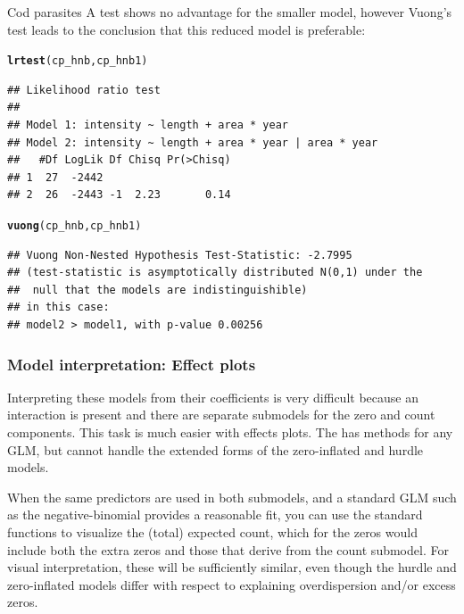 \documentclass[11pt]{book}\usepackage[]{graphicx}\usepackage[]{color}
\makeatletter
\newcommand{\hlstd}[1]{\textcolor[rgb]{0.345,0.345,0.345}{#1}}%
\newcommand{\hlkwd}[1]{\textcolor[rgb]{0.737,0.353,0.396}{\textbf{#1}}}%
\newenvironment{kframe}{%
 \def\at@end@of@kframe{}%
 \ifinner\ifhmode%
  \def\at@end@of@kframe{\end{minipage}}%
  \begin{minipage}{\columnwidth}%
 \fi\fi%
 \def\FrameCommand##1{\hskip\@totalleftmargin \hskip-\fboxsep
 \colorbox{shadecolor}{##1}\hskip-\fboxsep
     \hskip-\linewidth \hskip-\@totalleftmargin \hskip\columnwidth}%
 \MakeFramed {\advance\hsize-\width
   \@totalleftmargin\z@ \linewidth\hsize
   \@setminipage}}%
 {\par\unskip\endMakeFramed%
 \at@end@of@kframe}
\newenvironment{knitrout}{}{} %
\renewenvironment{knitrout}{\small\renewcommand{\baselinestretch}{.85}}{} %
\makeatother
\begin{document}
\begin{Example}[cod2]{Cod parasites}
A \LR test shows no advantage for the smaller model, however
Vuong's test leads to the conclusion that this reduced model is preferable:
\begin{knitrout}
\color{fgcolor}\begin{kframe}
\begin{alltt}
\hlkwd{lrtest}\hlstd{(cp_hnb, cp_hnb1)}
\end{alltt}
\begin{verbatim}
## Likelihood ratio test
## 
## Model 1: intensity ~ length + area * year
## Model 2: intensity ~ length + area * year | area * year
##   #Df LogLik Df Chisq Pr(>Chisq)
## 1  27  -2442                    
## 2  26  -2443 -1  2.23       0.14
\end{verbatim}
\begin{alltt}
\hlkwd{vuong}\hlstd{(cp_hnb, cp_hnb1)}
\end{alltt}
\begin{verbatim}
## Vuong Non-Nested Hypothesis Test-Statistic: -2.7995 
## (test-statistic is asymptotically distributed N(0,1) under the
##  null that the models are indistinguishible)
## in this case:
## model2 > model1, with p-value 0.00256
\end{verbatim}
\end{kframe}
\end{knitrout}


\end{Example}

\subsubsection{Model interpretation: Effect plots}

Interpreting these models from their coefficients is very difficult because an interaction
is present and there are separate submodels for the zero and count components.
This task is much easier with effects plots.
The  has methods for any GLM, but cannot handle the extended forms of
the zero-inflated and hurdle models.

When the same predictors are used in both
submodels, and a standard GLM such as the negative-binomial provides a reasonable
fit, you can use the standard  functions to visualize the (total)
expected count, which for the zeros would include both the extra zeros and
those that derive from the count submodel.  For visual interpretation, these will
be sufficiently similar, even though the hurdle and zero-inflated models differ
with respect to explaining overdispersion and/or excess zeros.
\end{document}
